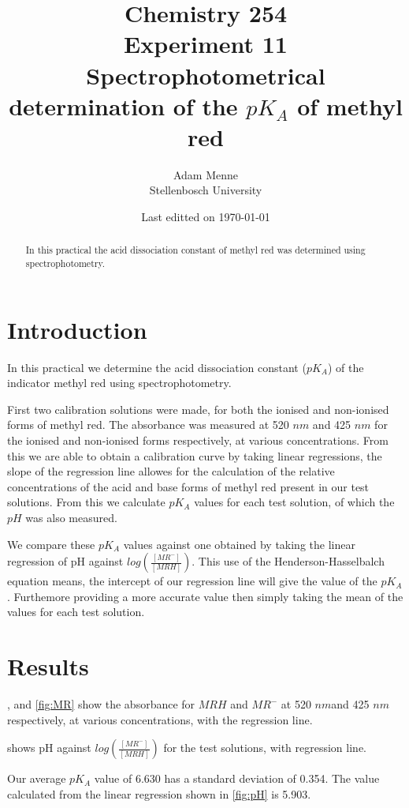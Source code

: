 \documentclass[a4paper, british]{article}
\title{Chemistry 254\\ Experiment 11\\ Spectrophotometrical determination of the \(pK_A\) of methyl red}
\date{Last editted on \today}
\author{Adam Menne\\ Stellenbosch University}
\begin{document}
\maketitle

\begin{abstract}
\noindent
In this practical the acid dissociation constant of methyl red was determined using spectrophotometry.
\end{abstract}

\tableofcontents

\newpage

\section{Introduction}

In this practical we determine the acid dissociation constant (\(pK_A\)) of the indicator methyl red using spectrophotometry.

First two calibration solutions were made, for both the ionised and non-ionised forms of methyl red. The absorbance was measured at 520 \(nm\) and 425 \(nm\) for the ionised and non-ionised forms respectively, at various concentrations. From this we are able to obtain a calibration curve by taking linear regressions, the slope of the regression line allowes for the calculation of the relative concentrations of the acid and base forms of methyl red present in our test solutions. From this we calculate \(pK_A\) values for each test solution, of which the \(pH\) was also measured.

We compare these \(pK_A\) values against one obtained by taking the linear regression of pH against \(log \left( \frac{[MR^-]}{[MRH]} \right)\). This use of the Henderson-Hasselbalch equation means, the intercept of our regression line will give the value of the \(pK_A\). Furthemore providing a more accurate value then simply taking the mean of the values for each test solution.


\section{Results}
, and \cref{fig:MR} show the absorbance for \(MRH\) and \(MR^-\) at 520 \(nm\)and 425 \(nm\) respectively, at various concentrations, with the regression line.

 shows pH against \(log \left( \frac{[MR^-]}{[MRH]} \right)\) for the test solutions, with regression line.

Our average \(pK_A\) value of 6.630 has a standard deviation of 0.354. The value calculated from the linear regression shown in \cref{fig:pH} is 5.903. 
\end{document}
